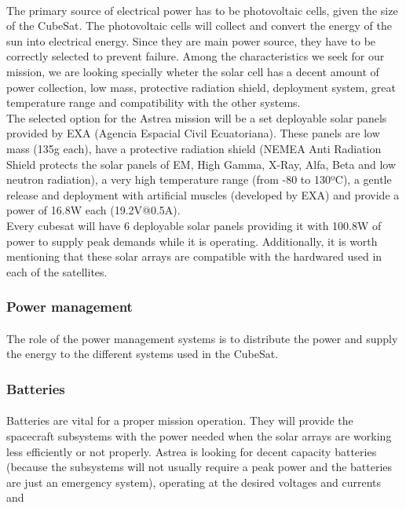 \paragraph{}The primary source of electrical power has to be photovoltaic cells, given the size of the CubeSat. The photovoltaic cells will collect and convert the energy of the sun into electrical energy. Since they are main power source, they have to be correctly selected to prevent failure. Among the characteristics we seek for our mission, we are looking specially wheter the solar cell has a decent amount of power collection, low mass, protective radiation shield, deployment system, great temperature range and compatibility with the other systems.\\
The selected option for the Astrea mission will be a set deployable solar panels provided by EXA (Agencia Espacial Civil Ecuatoriana). These panels are low mass (135g each), have a protective radiation shield (NEMEA Anti Radiation Shield protects the solar panels of EM, High Gamma, X-Ray, Alfa, Beta and low neutron radiation), a very high temperature range (from -80 to 130ºC), a gentle release and deployment with artificial muscles (developed by EXA) and provide a power of 16.8W each (19.2V@0.5A). \\
Every cubesat will have 6 deployable solar panels providing it with 100.8W of power to supply peak demands while it is operating. Additionally, it is worth mentioning that these solar arrays are compatible with the hardwared used in each of the satellites.

\subsubsection{Power management}

\paragraph{}The role of the power management systems is to distribute the power and supply the energy to the different systems used in the CubeSat.

\subsubsection{Batteries}

\paragraph{}	Batteries are vital for a proper mission operation. They will provide the spacecraft subsystems with the power needed when the solar arrays are working less efficiently or not properly. Astrea is looking for decent capacity batteries (because the subsystems will not usually require a peak power and the batteries are just an emergency system), operating at the desired voltages and currents and 

